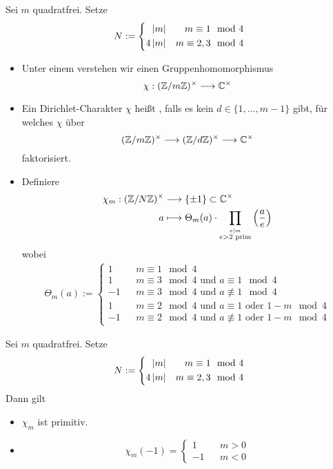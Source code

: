 \documentclass{book}
\newcommand{\Leg}[2]{\left(\frac{#1}{#2}\right)}
\begin{document}
Sei $m$ quadratfrei. Setze
\begin{align*}
N := 
\left\lbrace\begin{aligned}
\left|m\right| && m \equiv 1 \mod{4}\\
4\left|m\right| && m \equiv 2,3 \mod{4}
\end{aligned}\right.
\end{align*}
\begin{itemize}
\item Unter einem  verstehen wir einen Gruppenhomomorphismus
\[ \chi : (\mathbb{Z} / m\mathbb{Z})^\times \overset{}{\longrightarrow} \mathbb{C}^\times \]
\item Ein Dirichlet-Charakter $\chi$ heißt , falls es kein $d \in \{1,\ldots, m-1\}$ gibt, für welches $\chi$ über
\[ (\mathbb{Z} / m\mathbb{Z})^\times \overset{}{\longrightarrow}(\mathbb{Z} / d\mathbb{Z})^\times \overset{}{\longrightarrow} \mathbb{C}^\times \]
faktorisiert.
\item Definiere
\begin{align*}
\chi_m : (\Z /N\Z)^\times  & \Pfeil{} \{\pm 1\} \subset \C^\times\\
a & \longmapsto \Theta_m(a) \cdot \prod_{\stackrel{e|m}{e > 2 \text{ prim}}}\Leg{a}{e} 
\end{align*}
wobei
\begin{align*}
\Theta_m(a) := \left\lbrace
\begin{aligned}
1 && m \equiv 1 \mod{4}\\
1 && m \equiv 3 \mod{4} \text{ und } a \equiv 1 \mod{4}\\
-1 && m \equiv 3 \mod{4} \text{ und } a \not\equiv 1 \mod{4}\\
1 && m \equiv 2 \mod{4} \text{ und } a \equiv 1 \text{ oder } 1 - m \mod{4}\\
-1 && m \equiv 2 \mod{4} \text{ und } a \not\equiv 1 \text{ oder } 1 - m \mod{4}
\end{aligned}
\right.
\end{align*}
\end{itemize}

\Lem{}
Sei $m$ quadratfrei. Setze
\begin{align*}
N := 
\left\lbrace\begin{aligned}
\left|m\right| && m \equiv 1 \mod{4}\\
4\left|m\right| && m \equiv 2,3 \mod{4}
\end{aligned}\right.
\end{align*}
Dann gilt
\begin{itemize}
\item $\chi_m$ ist primitiv.
\item 
\[ \chi_m(-1) = \left\lbrace
\begin{aligned}
1 && m > 0\\
-1 && m < 0
\end{aligned}
\right. \]
\end{itemize}
\end{document}
